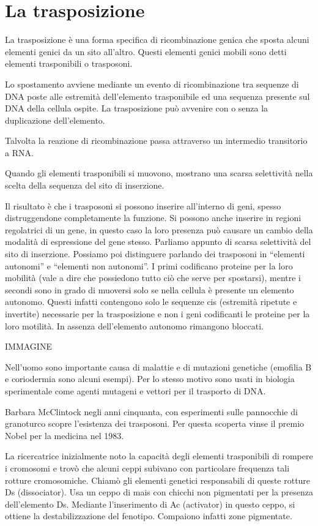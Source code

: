 \documentclass[]{article}
\date{}
\begin{document}
\section{La trasposizione}\label{la-trasposizione}

La trasposizione è una forma specifica di ricombinazione genica che
sposta alcuni elementi genici da un sito all'altro. Questi elementi
genici mobili sono detti elementi trasponibili o trasposoni.

Lo spostamento avviene mediante un evento di ricombinazione tra sequenze
di DNA poste alle estremità dell'elemento trasponibile ed una sequenza
presente sul DNA della cellula ospite. La trasposizione può avvenire con
o senza la duplicazione dell'elemento.

Talvolta la reazione di ricombinazione passa attraverso un intermedio
transitorio a RNA.

Quando gli elementi trasponibili si muovono, mostrano una scarsa
selettività nella scelta della sequenza del sito di inserzione.

Il risultato è che i trasposoni si possono inserire all'interno di geni,
spesso distruggendone completamente la funzione. Si possono anche
inserire in regioni regolatrici di un gene, in questo caso la loro
presenza può causare un cambio della modalità di espressione del gene
stesso. Parliamo appunto di scarsa selettività del sito di inserzione.
Possiamo poi distinguere parlando dei trasposoni in ``elementi
autonomi'' e ``elementi non autonomi''. I primi codificano proteine per
la loro mobilità (vale a dire che possiedono tutto ciò che serve per
spostarsi), mentre i secondi sono in grado di muoversi solo se nella
cellula è presente un elemento autonomo. Questi infatti contengono solo
le sequenze cis (estremità ripetute e invertite) necessarie per la
trasposizione e non i geni codificanti le proteine per la loro motilità.
In assenza dell'elemento autonomo rimangono bloccati.

IMMAGINE

Nell'uomo sono importante causa di malattie e di mutazioni genetiche
(emofilia B e coriodermia sono alcuni esempi). Per lo stesso motivo sono
usati in biologia sperimentale come agenti mutageni e vettori per il
trasporto di DNA.

Barbara McClintock negli anni cinquanta, con esperimenti sulle
pannocchie di granoturco scopre l'esistenza dei trasposoni. Per questa
scoperta vinse il premio Nobel per la medicina nel 1983.

La ricercatrice inizialmente noto la capacità degli elementi
trasponibili di rompere i cromosomi e trovò che alcuni ceppi subivano
con particolare frequenza tali rotture cromosomiche. Chiamò gli elementi
genetici responsabili di queste rotture Ds (dissociator). Usa un ceppo
di mais con chicchi non pigmentati per la presenza dell'elemento Ds.
Mediante l'inserimento di Ac (activator) in questo ceppo, si ottiene la
destabilizzazione del fenotipo. Compaiono infatti zone pigmentate.
\end{document}
